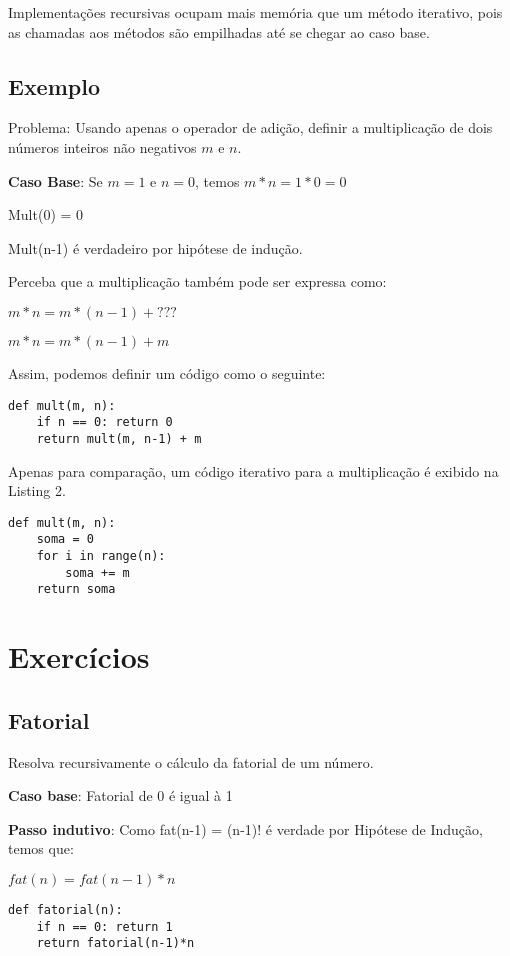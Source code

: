 \documentclass[a4paper, twocolumn]{article}
\theoremstyle{definition}
\begin{document}
Implementações recursivas ocupam mais memória que um método iterativo, pois as chamadas aos métodos são empilhadas até se chegar ao caso base.

\subsection{Exemplo}
Problema: Usando apenas o operador de adição, definir a multiplicação de dois números inteiros não negativos $m$ e $n$.

\textbf{Caso Base}: Se $m=1$ e $n=0$, temos $m*n = 1*0 = 0$

Mult(0) = 0

Mult(n-1) é verdadeiro por hipótese de indução.

Perceba que a multiplicação também pode ser expressa como:

$m*n = m*(n-1) + ???$

$m*n = m*(n-1) + m$

Assim, podemos definir um código como o seguinte:

\begin{lstlisting}[label=mult_rec,caption= Multiplicação recursiva]
def mult(m, n):
	if n == 0: return 0
	return mult(m, n-1) + m
\end{lstlisting}

Apenas para comparação, um código iterativo para a multiplicação é exibido na Listing 2.
\begin{lstlisting}[label=mult_iter,caption= Multiplicação iterativa]
def mult(m, n):
	soma = 0	
	for i in range(n):
		soma += m
	return soma
\end{lstlisting}

\section{Exercícios}
\subsection{Fatorial}
Resolva recursivamente o cálculo da fatorial de um número.

\textbf{Caso base}: Fatorial de 0 é igual à 1

\textbf{Passo indutivo}: Como fat(n-1) = (n-1)! é verdade por Hipótese de Indução, temos que:

$fat(n) = fat(n-1)*n$

\begin{lstlisting}[label=fatorial,caption= Fatorial recursiva]
def fatorial(n):
	if n == 0: return 1
	return fatorial(n-1)*n
\end{lstlisting}
\end{document}
